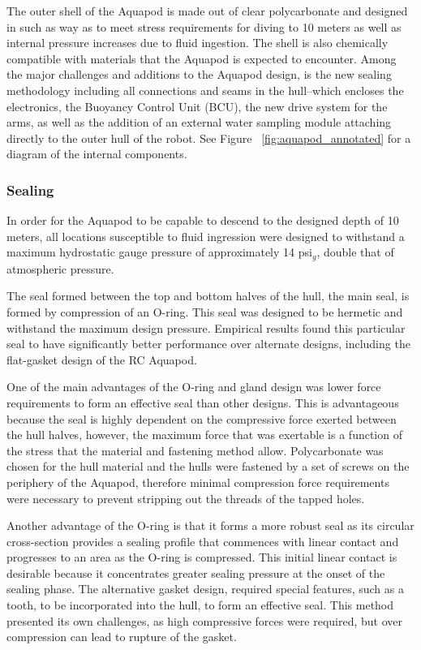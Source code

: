 The outer shell of the Aquapod is made out of clear polycarbonate and designed in such as way as to meet stress requirements for diving to 10 meters as well as internal pressure increases due to fluid ingestion. The shell is also chemically compatible with materials that the Aquapod is expected to encounter.  Among the major challenges and additions to the Aquapod design, is the new sealing methodology including all connections and seams in the hull--which encloses the electronics, the Buoyancy Control Unit (BCU), the new drive system for the arms, as well as the addition of an external water sampling module attaching directly to the outer hull of the robot. See Figure ~\ref{fig:aquapod_annotated} for a diagram of the internal components.  

\subsubsection{Sealing}
In order for the Aquapod to be capable to descend to the designed depth of 10 meters, all locations susceptible to fluid ingression were designed to withstand a maximum hydrostatic gauge pressure of approximately 14 psi\(_g\), double that of atmospheric pressure. 

The seal formed between the top and bottom halves of the hull, the main seal, is formed by compression of an O-ring. This seal was designed to be hermetic and withstand the maximum design pressure.  Empirical results found this particular seal to have significantly better performance over alternate designs, including the flat-gasket design of the RC Aquapod.
	
One of the main advantages of the O-ring and gland design was lower force requirements to form an effective seal than other designs. This is advantageous because the seal is highly dependent on the compressive force exerted between the hull halves, however, the maximum force that was exertable is a function of the stress that the material and fastening method allow. Polycarbonate was chosen for the hull material and the hulls were fastened by a set of screws on the periphery of the Aquapod, therefore minimal compression force requirements were necessary to prevent stripping out the threads of the tapped holes.

Another advantage of the O-ring is that it forms a more robust seal as its circular cross-section provides a sealing profile that commences with linear contact and progresses to an area as the O-ring is compressed. This initial linear contact is desirable because it concentrates greater sealing pressure at the onset of the sealing phase. The alternative gasket design, required special features, such as a tooth, to be incorporated into the hull, to form an effective seal.  This method presented its own challenges, as high compressive forces were required, but over compression can lead to rupture of the gasket. 


